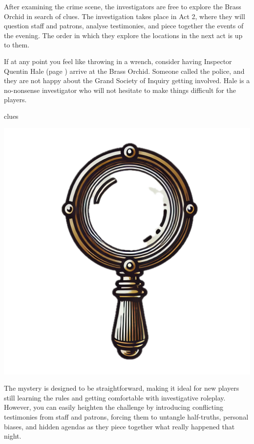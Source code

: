 After examining the crime scene, the investigators are free to explore the Brass Orchid in search of clues. The investigation takes place in Act 2, where they will question staff and patrons, analyse testimonies, and piece together the events of the evening. The order in which they explore the locations in the next act is up to them.

\vspace{\baselineskip}
\begin{GmTips}
	If at any point you feel like throwing in a wrench, consider having Inspector Quentin Hale (page \pageref{npc:inspector-hale}) arrive at the Brass Orchid. Someone called the police, and they are not happy about the Grand Society of Inquiry getting involved. Hale is a no-nonsense investigator who will not hesitate to make things difficult for the players.
\end{GmTips}

\newcolumn
{clues}

\begin{center}
	\includegraphics[width=.5\linewidth]{img/separt/detective-glass}
\end{center}

\begin{GmTips}
	The mystery is designed to be straightforward, making it ideal for new players still learning the rules and getting comfortable with investigative roleplay. However, you can easily heighten the challenge by introducing conflicting testimonies from staff and patrons, forcing them to untangle half-truths, personal biases, and hidden agendas as they piece together what really happened that night.
\end{GmTips}

